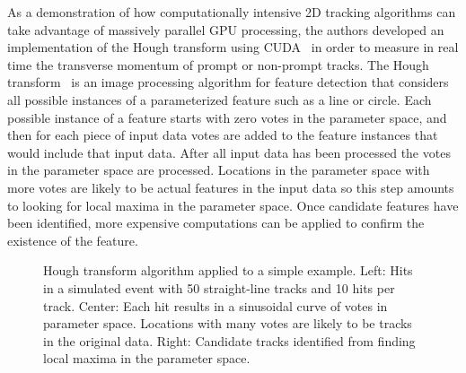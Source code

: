 \documentclass[preprint,sort&compress]{elsarticle}
\begin{document}
As a demonstration of how computationally intensive 2D tracking algorithms can take advantage of massively parallel GPU processing, the authors developed an implementation of the Hough transform using CUDA~\cite{Halyo:2013} in order to measure in real time the transverse momentum of prompt or non-prompt tracks.  The Hough transform~\cite{bib:HT1,bib:HT2,bib:HT3} is an image processing algorithm for feature detection that considers all possible instances of a parameterized feature such as a line or circle.  Each possible instance of a feature starts with zero votes in the parameter space, and then for each piece of input data votes are added to the feature instances that would include that input data.  After all input data has been processed the votes in the parameter space are processed.  Locations in the parameter space with more votes are likely to be actual features in the input data so this step amounts to looking for local maxima in the parameter space.  Once candidate features have been identified, more expensive computations can be applied to confirm the existence of the feature.

\begin{figure}[!Hhtb]
\begin{center}
  \caption{Hough transform algorithm applied to a simple example. Left: Hits in a simulated event with 50
    straight-line tracks and 10 hits per track. Center: Each hit results in a sinusoidal curve of votes in parameter
    space. Locations with many votes are likely to be tracks in the original data. Right:
    Candidate tracks identified from finding local maxima in the parameter space.\label{fig:hough}}
\end{center}
\end{figure}
\end{document}

